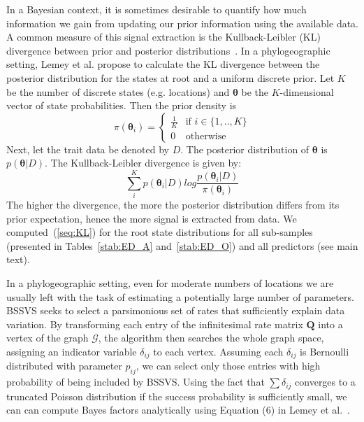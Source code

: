 \documentclass[a4paper,10pt]{article}
\begin{document}
In a Bayesian context, it is sometimes desirable to quantify how much information we gain from updating our prior information using the available data.
A common measure of this signal extraction is the Kullback-Leibler (KL) divergence between prior and posterior distributions~\cite{M-KL}.
In a phylogeographic setting, Lemey et al. \cite{M-roots} propose to calculate the KL divergence between the posterior distribution for the states at root and a uniform discrete prior.
Let $K$ be the number of discrete states (e.g. locations) and $\boldsymbol\theta$ be the $K$-dimensional vector of state probabilities.
Then the prior density is
\begin{equation}
\label{seq:prior}
\pi(\boldsymbol\theta_i)  = \begin{cases}  \frac{1}{K} &\mbox{if } i \in \{1,..,K\}  \\ 
0 & \mbox{otherwise} \end{cases}
\end{equation}
Next, let the trait data be denoted by $D$.
The posterior distribution of $\boldsymbol\theta$ is $p(\boldsymbol\theta|D)$.
The Kullback-Leibler divergence is given by:
\begin{equation}
\label{seq:KL}
\sum_{i}^{K} p(\boldsymbol\theta_i|D)log\frac{p(\boldsymbol\theta_i|D)}{\pi(\boldsymbol\theta_i)}
\end{equation}
The higher the divergence, the more the posterior distribution differs from its prior expectation, hence the more signal is extracted from data.
We computed~(\ref{seq:KL}) for the root state distributions for all sub-samples (presented in Tables~\ref{stab:ED_A} and~\ref{stab:ED_O}) and all predictors (see main text).

In a phylogeographic setting, even for moderate numbers of locations we are usually left with the task of estimating a potentially large number of parameters. 
BSSVS seeks to select a parsimonious set of rates that sufficiently explain data variation.
By transforming each entry of the infinitesimal rate matrix $\mathbf{Q}$ into a vertex of the graph $\mathcal{G}$, the algorithm then searches the whole graph space, assigning an indicator variable $\delta_{ij}$ to each vertex.
Assuming each $\delta_{ij}$ is Bernoulli distributed with parameter $p_{ij}$, we can select only those entries with high probability of being included by BSSVS.
Using the fact that $\sum\delta_{ij}$ converges to a truncated Poisson distribution if the success probability is sufficiently small, we can can compute Bayes factors analytically using Equation (6) in Lemey et al.~\cite{M-roots}.
\end{document}
